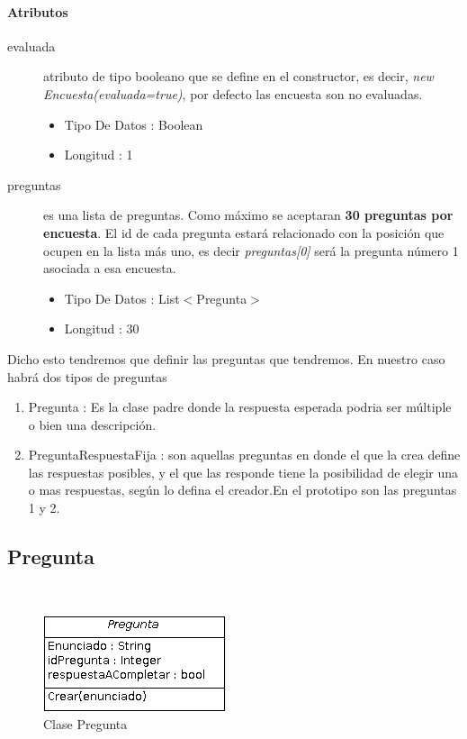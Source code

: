 \documentclass{article}
\begin{document}
\paragraph{\large{Atributos}}
\begin{description}
\item[evaluada] atributo de tipo booleano que se define en el constructor, es decir, \textit{new Encuesta(evaluada=true)}, por defecto las encuesta son no evaluadas.
\begin{itemize}
\item Tipo De Datos : Boolean
\item Longitud : 1
\end{itemize}
\item[preguntas] es una lista de preguntas. Como m\'aximo se aceptaran \textbf{30 preguntas por encuesta}. El id de cada pregunta estar\'a relacionado con la posici\'on que ocupen en la lista m\'as uno, es decir \textit{preguntas[0]} ser\'a la pregunta n\'umero 1 asociada a esa encuesta. 
\begin{itemize}
\item Tipo De Datos : List$<$Pregunta$>$
\item Longitud : 30
\end{itemize}
\end{description}

Dicho esto tendremos que definir las preguntas que tendremos. En nuestro caso habr\'a dos tipos de preguntas
\begin{enumerate}
\item Pregunta : Es la clase padre donde la respuesta esperada podria ser m\'ultiple o bien una descripci\'on.
\item PreguntaRespuestaFija : son aquellas preguntas en donde el que la crea define las respuestas posibles, y el que las responde tiene la posibilidad de elegir una o mas respuestas, seg\'un lo defina el creador.En el prototipo son las preguntas 1 y 2.
\end{enumerate}
\subsection{Pregunta} \


\begin{figure}[h]
\centering
\includegraphics[scale=0.8]{Pregunta}

\caption{Clase Pregunta}
\end{figure}
\end{document}
